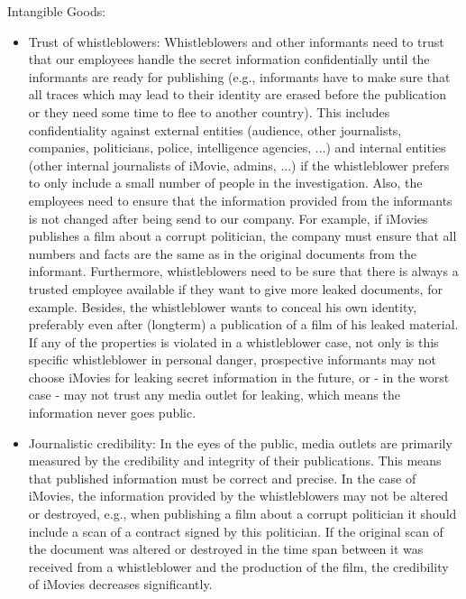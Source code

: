 \documentclass[english]{article}
\begin{document}
\begin{itemize}
	\end{itemize}

  Intangible Goods:
  \begin{itemize}

    \item Trust of whistleblowers: Whistleblowers and other informants need to trust that our employees handle the secret information confidentially until the informants are ready for publishing (e.g., informants have to make sure that all traces which may lead to their identity are erased before the publication or they need some time to flee to another country). This includes confidentiality against external entities (audience, other journalists, companies, politicians, police, intelligence agencies, ...) and internal entities (other internal journalists of iMovie, admins, ...) if the whistleblower prefers to only include a small number of people in the investigation. Also, the employees need to ensure that the information provided from the informants is not changed after being send to our company. For example, if iMovies publishes a film about a corrupt politician, the company must ensure that all numbers and facts are the same as in the original documents from the informant. Furthermore, whistleblowers need to be sure that there is always a trusted employee available if they want to give more leaked documents, for example. Besides, the whistleblower wants to conceal his own identity, preferably even after (longterm) a publication of a film of his leaked material. If any of the properties is violated in a whistleblower case, not only is this specific whistleblower in personal danger, prospective informants may not choose iMovies for leaking secret information in the future, or - in the worst case - may not trust any media outlet for leaking, which means the information never goes public.
    \item Journalistic credibility: In the eyes of the public, media outlets are primarily measured by the credibility and integrity of their publications. This means that published information must be correct and precise. In the case of iMovies, the information provided by the whistleblowers may not be altered or destroyed, e.g., when publishing a film about a corrupt politician it should include a scan of a contract signed by this politician. If the original scan of the document was altered or destroyed in the time span between it was received from a whistleblower and the production of the film, the credibility of iMovies decreases significantly.

\end{itemize}
\end{document}

